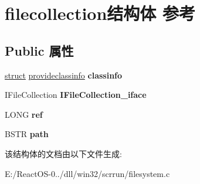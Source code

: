 \hypertarget{structfilecollection}{}\section{filecollection结构体 参考}
\label{structfilecollection}
\subsection*{Public 属性}
\begin{DoxyCompactItemize}
\item 
\mbox{\label{structfilecollection_a723d1fd599fdad0e60b63d62ab5203f8}} 
\hyperlink{interfacestruct}{struct} \hyperlink{structprovideclassinfo}{provideclassinfo} {\bfseries classinfo}
\item 
\mbox{\label{structfilecollection_acc4d75612260a726d833d4b05a95c948}} 
I\+File\+Collection {\bfseries I\+File\+Collection\+\_\+iface}
\item 
\mbox{\label{structfilecollection_a743b956095d5ebc9d0a21d6c966a93a8}} 
L\+O\+NG {\bfseries ref}
\item 
\mbox{\label{structfilecollection_a44748aef1195ef7519986fc24bbf5b28}} 
B\+S\+TR {\bfseries path}
\end{DoxyCompactItemize}


该结构体的文档由以下文件生成\+:\begin{DoxyCompactItemize}
\item 
E\+:/\+React\+O\+S-\/0../dll/win32/scrrun/filesystem.\+c\end{DoxyCompactItemize}
